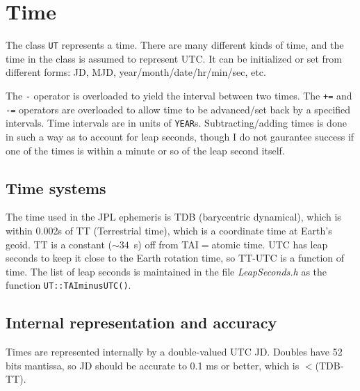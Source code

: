 \documentclass[11pt,preprint,flushrt]{aastex}
\begin{document}
\section{Time}
The class {\tt UT} represents a time.  There are many different kinds of time, and the time in the class is assumed to represent UTC.  It can be initialized or set from different forms: JD, MJD, year/month/date/hr/min/sec, etc.

The {\tt -} operator is overloaded to yield the interval between two times.  The {\tt +=} and {\tt -=} operators are overloaded to allow time to be advanced/set back by a specified intervals.  Time intervals are in units of {\tt YEAR}s. 
Subtracting/adding times is done in such a way as to account for leap
seconds, though I do not gaurantee success if one of the times is within
a minute or so of the leap second itself.  

\subsection{Time systems}
The time used in the JPL ephemeris is TDB (barycentric dynamical), which
is within 0.002s of TT (Terrestrial time), which is a coordinate time at
Earth's geoid.  TT is a constant ($\sim34$~s) off from TAI$=$atomic time.
UTC has leap seconds to keep it close to the Earth rotation time, so
TT-UTC is a function of time. The list of leap seconds is maintained
in the file {\it LeapSeconds.h} as the function {\tt UT::TAIminusUTC()}.


\subsection{Internal representation and accuracy}
Times are represented internally by a double-valued UTC JD.  Doubles
 have 52 bits mantissa, so JD should be accurate to 0.1 ms or better, which is $<$(TDB-TT).
\end{document}
